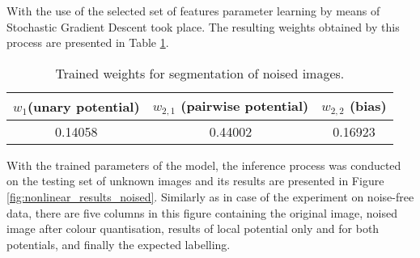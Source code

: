 With the use of the selected set of features parameter learning by means of Stochastic Gradient Descent took place. The resulting weights obtained by this process are presented in Table \ref{table:weights_nonlinear_noised}.
\begin{table}[ht]
\caption{Trained weights for segmentation of noised images.}
\centering
\begin{tabular}{|c|c|c|}
\hline
\rowcolor[HTML]{cecaca} 
$w_1$(unary potential) & $w_{2,1}$ (pairwise potential) & $w_{2,2}$ (bias) \\ \hline
0.14058 & 0.44002 & 0.16923 \\ \hline
\end{tabular}
\label{table:weights_nonlinear_noised}
\end{table}

With the trained parameters of the model, the inference process was conducted on the testing set of unknown images and its results are presented in Figure \ref{fig:nonlinear_results_noised}. Similarly as in case of the experiment on noise-free data, there are five columns in this figure containing the original image, noised image after colour quantisation, results of local potential only and for both potentials, and finally the expected labelling. 

